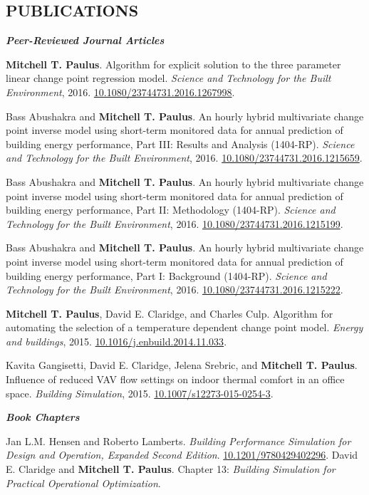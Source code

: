 \documentclass[margin]{res} %
\begin{document}
\begin{resume}
\newcommand{\doi}[1]{\href{https://doi.org/#1}{#1}}

\section{PUBLICATIONS}
{\sl \textbf{Peer-Reviewed Journal Articles}}

\textbf{Mitchell T. Paulus}. Algorithm for explicit solution to the three parameter linear change point regression model.
\textit{Science and Technology for the Built Environment}, 2016. \href{https://doi.org/10.1080/23744731.2016.1267998}{10.1080/23744731.2016.1267998}.

Bass Abushakra and \textbf{Mitchell T. Paulus}.
An hourly hybrid multivariate change point inverse model using short-term monitored data for annual prediction of building energy performance, {Part III: Results and Analysis (1404-RP)}.
\textit{Science and Technology for the Built Environment}, 2016. \doi{10.1080/23744731.2016.1215659}.

Bass Abushakra and \textbf{Mitchell T. Paulus}.
An hourly hybrid multivariate change point inverse model using short-term monitored data for annual prediction of building energy performance, {Part II: Methodology (1404-RP)}.
\textit{Science and Technology for the Built Environment}, 2016. \doi{10.1080/23744731.2016.1215199}.

Bass Abushakra and \textbf{Mitchell T. Paulus}.
An hourly hybrid multivariate change point inverse model using short-term monitored data for annual prediction of building energy performance, {Part I: Background (1404-RP)}.
\textit{Science and Technology for the Built Environment}, 2016. \doi{10.1080/23744731.2016.1215222}.

\textbf{Mitchell T. Paulus}, David E. Claridge, and Charles Culp. Algorithm for automating the selection of a temperature dependent change point model.
\textit{Energy and buildings}, 2015. \href{https://doi.org/10.1016/j.enbuild.2014.11.033}{10.1016/j.enbuild.2014.11.033}.

Kavita Gangisetti, David E. Claridge, Jelena Srebric, and \textbf{Mitchell T. Paulus}. Influence of reduced {VAV} flow settings on indoor thermal comfort in an office space.
\textit{Building Simulation}, 2015. \href{https://doi.org/10.1007/s12273-015-0254-3}{10.1007/s12273-015-0254-3}.

{\sl \textbf{Book Chapters}}

Jan L.M. Hensen and Roberto Lamberts. \textit{Building Performance Simulation for Design and Operation, Expanded Second Edition}.
\href{https://doi.org/10.1201/9780429402296}{10.1201/9780429402296}.
David E. Claridge and \textbf{Mitchell T. Paulus}. Chapter 13: \textit{Building Simulation for Practical Operational Optimization}.



\end{resume}
\end{document}
